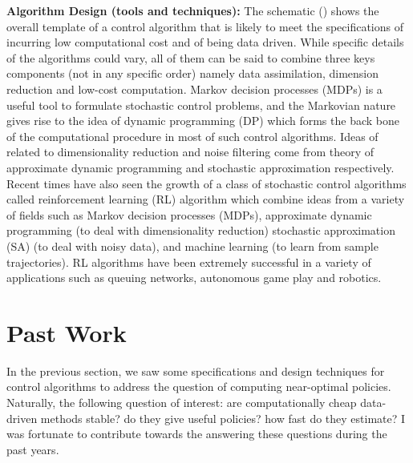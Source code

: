 \documentclass[onecolumn,12pt]{IEEEtran}
\begin{document}
\textbf{Algorithm Design (tools and techniques):} The schematic () shows the overall template of a control algorithm that is likely to meet the specifications of incurring low computational cost and of being data driven. 
While specific details of the algorithms could vary, all of them can be said to combine three keys components (not in any specific order) namely data assimilation, dimension reduction and low-cost computation. Markov decision processes (MDPs) is a useful tool to formulate stochastic control problems, and the Markovian nature gives rise to the idea of dynamic programming (DP) which forms the back bone of the computational procedure in most of such control algorithms. Ideas of related to dimensionality reduction and noise filtering come from theory of approximate dynamic programming and stochastic approximation respectively. Recent times have also seen the growth of a class of stochastic control algorithms called reinforcement learning (RL) algorithm which combine ideas from a variety of fields such as Markov decision processes (MDPs), approximate dynamic programming (to deal with dimensionality reduction) stochastic approximation  (SA) (to deal with noisy data), and machine learning (to learn from sample trajectories). RL algorithms have been extremely successful in a variety of applications such as queuing networks, autonomous game play and robotics.

\section{Past Work}\label{past}
In the previous section, we saw some specifications and design techniques for control algorithms to address the question of computing near-optimal policies. Naturally, the following question of interest: are computationally cheap data-driven methods stable? do they give useful policies? how fast do they estimate? I was fortunate to contribute towards the answering these questions during the past years.
\end{document}
